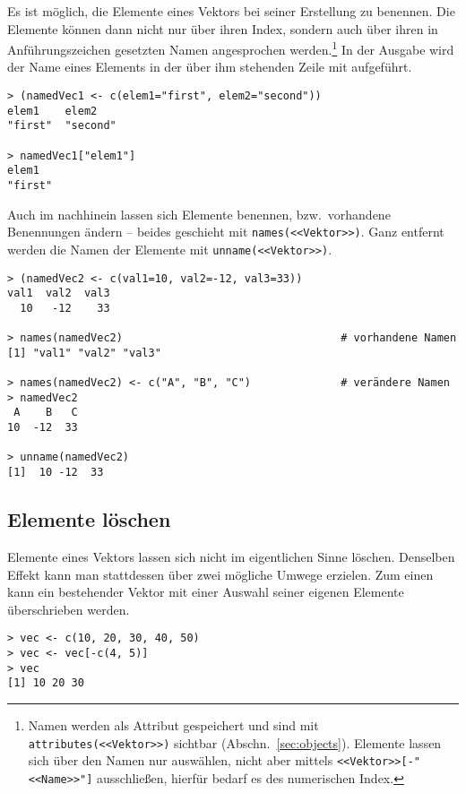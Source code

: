 Es ist möglich, die Elemente eines Vektors bei seiner Erstellung zu benennen. Die Elemente können dann nicht nur über ihren Index, sondern auch über ihren in Anführungszeichen gesetzten Namen angesprochen werden.\footnote{Namen werden als Attribut gespeichert und sind mit \lstinline!attributes(<<Vektor>>)! sichtbar (Abschn.\ \ref{sec:objects}). Elemente lassen sich über den Namen nur auswählen, nicht aber mittels \lstinline!<<Vektor>>[-"<<Name>>"]! ausschließen, hierfür bedarf es des numerischen Index.} In der Ausgabe wird der Name eines Elements in der über ihm stehenden Zeile mit aufgeführt.
\begin{lstlisting}
> (namedVec1 <- c(elem1="first", elem2="second"))
elem1    elem2
"first"  "second"

> namedVec1["elem1"]
elem1
"first"
\end{lstlisting}

Auch im nachhinein lassen sich Elemente benennen, bzw.\ vorhandene Benennungen ändern -- beides geschieht mit \lstinline!names(<<Vektor>>)!. Ganz entfernt werden die Namen der Elemente mit  \lstinline!unname(<<Vektor>>)!.
\begin{lstlisting}
> (namedVec2 <- c(val1=10, val2=-12, val3=33))
val1  val2  val3
  10   -12    33

> names(namedVec2)                                  # vorhandene Namen
[1] "val1" "val2" "val3"

> names(namedVec2) <- c("A", "B", "C")              # verändere Namen
> namedVec2
 A    B   C
10  -12  33

> unname(namedVec2)
[1]  10 -12  33
\end{lstlisting}

\subsection{Elemente löschen}

Elemente eines Vektors lassen sich nicht im eigentlichen Sinne löschen. Denselben Effekt kann man stattdessen über zwei mögliche Umwege erzielen. Zum einen kann ein bestehender Vektor mit einer Auswahl seiner eigenen Elemente überschrieben werden.
\begin{lstlisting}
> vec <- c(10, 20, 30, 40, 50)
> vec <- vec[-c(4, 5)]
> vec
[1] 10 20 30
\end{lstlisting}

